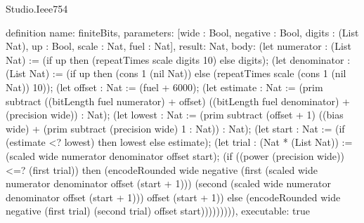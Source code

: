 \begin{lexlean}{Studio.Ieee754}
\begin{semanticmodule}
definition{
  name: finiteBits,
  parameters: [wide : Bool, negative : Bool, digits : (List Nat), up : Bool, scale : Nat, fuel : Nat],
  result: Nat,
  body: (let numerator : (List Nat) := (if up then (repeatTimes scale digits 10) else digits); (let denominator : (List Nat) := (if up then (cons 1 (nil Nat)) else (repeatTimes scale (cons 1 (nil Nat)) 10)); (let offset : Nat := (fuel + 6000); (let estimate : Nat := (prim subtract ((bitLength fuel numerator) + offset) ((bitLength fuel denominator) + (precision wide)) : Nat); (let lowest : Nat := (prim subtract (offset + 1) ((bias wide) + (prim subtract (precision wide) 1 : Nat)) : Nat); (let start : Nat := (if (estimate <? lowest) then lowest else estimate); (let trial : (Nat * (List Nat)) := (scaled wide numerator denominator offset start); (if ((power (precision wide)) <=? (first trial)) then (encodeRounded wide negative (first (scaled wide numerator denominator offset (start + 1))) (second (scaled wide numerator denominator offset (start + 1))) offset (start + 1)) else (encodeRounded wide negative (first trial) (second trial) offset start))))))))),
  executable: true
}


\end{semanticmodule}
\end{lexlean}
